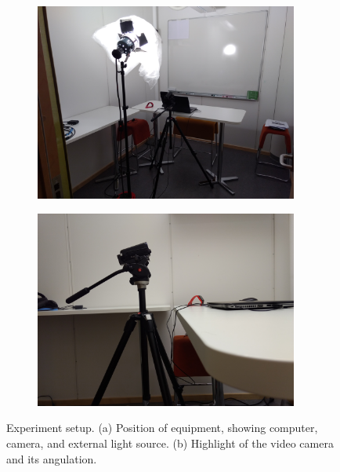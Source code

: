 \begin{figure}[ht]
\centering
  \begin{subfigure}[b]{0.5\textwidth}
    \includegraphics[width=0.95\textwidth]{figures/experiment2-setup-overall}
    \caption{}
    \label{fig:experiment2-setup-overall}
  \end{subfigure}%
  \begin{subfigure}[b]{0.5\textwidth}
    \centering
    \includegraphics[width=0.95\textwidth]{figures/experiment2-setup-camera}
    \caption{}
    \label{fig:experiment2-setup-camera}
  \end{subfigure}
  \caption{Experiment setup. (a) Position of equipment, showing computer, camera, and external light source. (b) Highlight of the video camera and its angulation.}
  \label{fig:experiment2-setup}
\end{figure}


